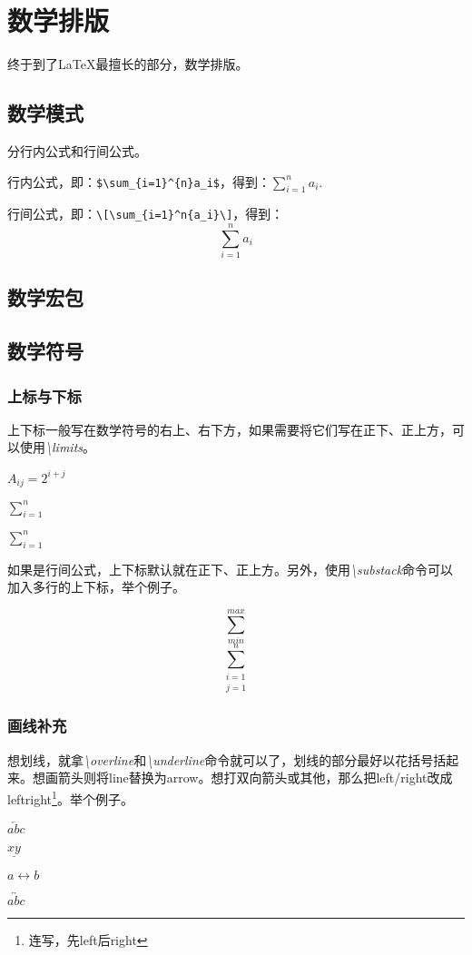 {\let\clearpage\relax \chapter{数学排版}}

终于到了\LaTeX 最擅长的部分，数学排版。

\section{数学模式}
分行内公式和行间公式。

行内公式，即：\verb|$\sum_{i=1}^{n}a_i$|，得到：$\sum_{i=1}^{n}a_i$.

行间公式，即：\verb|\[\sum_{i=1}^n{a_i}\]|，得到：
\[\sum_{i=1}^{n}a_i\]

\section{数学宏包}

\section{数学符号}
\subsection{上标与下标}
上下标一般写在数学符号的右上、右下方，如果需要将它们写在正下、正上方，可以使用\emph{\textbackslash limits}。
\begin{codeshow}
$A_{ij}=2^{i+j}$\par
$\sum_{i=1}^{n}$\par
$\sum\limits_{i=1}^{n}$\par
\end{codeshow}

如果是行间公式，上下标默认就在正下、正上方。另外，使用\emph{\textbackslash substack}命令可以加入多行的上下标，举个例子。
\begin{codeshow}
\[\sum_{min}^{max}\]
\[\sum_{\substack{i=1\\j=1}}^{n}\]
\end{codeshow}

\subsection{画线补充}
想划线，就拿\emph{\textbackslash overline}和\emph{\textbackslash underline}命令就可以了，划线的部分最好以花括号括起来。想画箭头则将line替换为arrow。想打双向箭头或其他，那么把left/right改成leftright\footnote{连写，先left后right}。举个例子。
\begin{codeshow}
$ \overleftarrow{abc} $\par
$ \underline{xy} $\par
$ a \leftrightarrow b $\par
$ \overleftrightarrow{abc} $
\end{codeshow}

